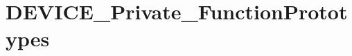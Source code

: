 \hypertarget{group___d_e_v_i_c_e___private___function_prototypes}{}\section{D\+E\+V\+I\+C\+E\+\_\+\+Private\+\_\+\+Function\+Prototypes}
\label{group___d_e_v_i_c_e___private___function_prototypes}
